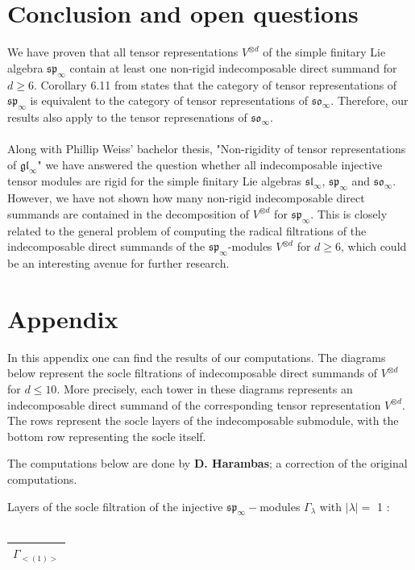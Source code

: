 \section{Conclusion and open questions}
We have proven that all tensor representations $V^{\otimes d}$ of the simple finitary Lie algebra $\mathfrak{sp}_{\infty}$ contain at least one non-rigid indecomposable direct summand for $d\ge6$. Corollary 6.11 from \cite{cohen} states that the category of  tensor representations of $\mathfrak{sp}_{\infty}$  is equivalent to the category of tensor representations of $\mathfrak{so}_{\infty}$. Therefore, our results also apply to the tensor represenations of $\mathfrak{so}_{\infty}$. 
\\\\Along with Phillip Weiss' bachelor thesis, "Non-rigidity of tensor representations of $\mathfrak{gl}_{\infty}$" we have answered the question whether all indecomposable injective tensor modules are rigid for the simple finitary Lie algebras $\mathfrak{sl}_{\infty}$, $\mathfrak{sp}_{\infty}$ and $\mathfrak{so}_{\infty}$. However, we have not shown how many non-rigid indecomposable direct summands are contained in the decomposition of $V^{\otimes d}$ for $\mathfrak{sp}_{\infty}$. This is closely related to the general problem of computing the radical filtrations of the indecomposable direct summands of the $\mathfrak{sp}_{\infty}$-modules $V^{\otimes d}$ for $d\geq 6$, which could be an interesting avenue for further research.
\section{Appendix}
In this appendix one can find the results of our computations. The diagrams below represent the socle filtrations of indecomposable direct summands of $V^{\otimes d}$ for $d\leq10$. More precisely, each tower in these diagrams represents an indecomposable direct summand
of the corresponding tensor representation $V^{\otimes d}.$ The rows represent the socle
layers of the indecomposable submodule, with the bottom row representing the socle itself.

The computations below are done by \textbf{D. Harambas}; a correction of the original computations.

Layers of the socle filtration of the injective $\mathfrak{sp}_\infty-$modules $\Gamma_{\lambda}$ with $|\lambda| = $ 1 : \\\\
\begin{minipage}{1\textwidth}
\centering
\begin{tabular}{|c|}\hline
$\Gamma_{<(
1
)>}$
\\
\hline\end{tabular}\end{minipage}
\\



